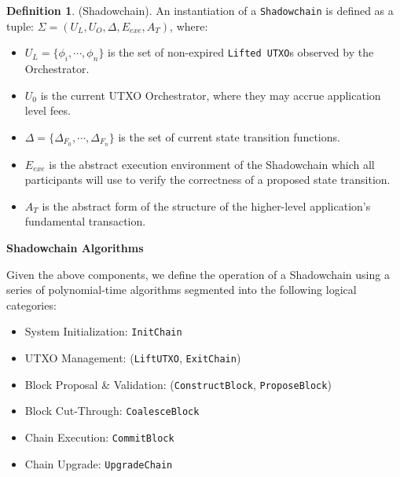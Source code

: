 \documentclass[12pt,a4paper]{article}
\theoremstyle{definition}
\newtheorem{definition}{Definition}[section]
\begin{document}
\begin{definition}{(Shadowchain).} An instantiation of a \texttt{Shadowchain}
    is defined as a tuple: $\Sigma = (U_{L}, U_{O}, \Delta, E_{exe},
    A_{T})$, where:
\end{definition}

\begin{itemize}
    \item $U_{L} = \{\phi_i, \cdots, \phi_n\}$ is the set of non-expired
        \texttt{Lifted UTXO}s observed by the Orchestrator.

    \item $U_{0}$ is the current UTXO Orchestrator, where they may accrue
        application level fees.

    \item $\Delta =  \{ \Delta_{F_0}, \cdots, \Delta_{F_n} \}$ is the set of
        current state transition functions.

    \item $E_{exe}$ is the abstract execution environment of the Shadowchain
        which all participants will use to verify the correctness of a proposed
        state transition.

    \item $A_{T}$ is the abstract form of the structure of the higher-level
        application's fundamental transaction.

\end{itemize}

\begin{center}
    \textbf{Shadowchain Algorithms}
\end{center}

Given the above components, we define the operation of a Shadowchain using a
series of polynomial-time algorithms segmented into the following logical
categories:

\begin{itemize}
    \item System Initialization: \texttt{InitChain}
    \item UTXO Management: (\texttt{LiftUTXO}, \texttt{ExitChain})
    \item Block Proposal \& Validation: (\texttt{ConstructBlock}, \texttt{ProposeBlock})
    \item Block Cut-Through: \texttt{CoalesceBlock}
    \item Chain Execution: \texttt{CommitBlock}
    \item Chain Upgrade: \texttt{UpgradeChain}
\end{itemize}
\end{document}
